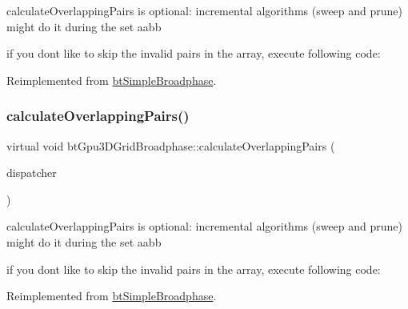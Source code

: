 calculate\+Overlapping\+Pairs is optional\+: incremental algorithms (sweep and prune) might do it during the set aabb 

if you don\textquotesingle{}t like to skip the invalid pairs in the array, execute following code\+: 

Reimplemented from \hyperlink{classbtSimpleBroadphase_ac899d483e888fa132677125c88991de8}{bt\+Simple\+Broadphase}.

\mbox{\label{classbtGpu3DGridBroadphase_ac59344854cc1f33ded7cdedd72c7a454}} 
\subsubsection{\texorpdfstring{calculate\+Overlapping\+Pairs()}{calculateOverlappingPairs()}\hspace{0.1cm}{\footnotesize\ttfamily [2/2]}}
{\footnotesize\ttfamily virtual void bt\+Gpu3\+D\+Grid\+Broadphase\+::calculate\+Overlapping\+Pairs (\begin{DoxyParamCaption}\item[{\hyperlink{classbtDispatcher}{bt\+Dispatcher} $\ast$}]{dispatcher }\end{DoxyParamCaption})\hspace{0.3cm}{\ttfamily [virtual]}}



calculate\+Overlapping\+Pairs is optional\+: incremental algorithms (sweep and prune) might do it during the set aabb 

if you don\textquotesingle{}t like to skip the invalid pairs in the array, execute following code\+: 

Reimplemented from \hyperlink{classbtSimpleBroadphase_ac899d483e888fa132677125c88991de8}{bt\+Simple\+Broadphase}.

\mbox{\label{classbtGpu3DGridBroadphase_ad381f8a0aca01a7147b7a3eafad9ac5a}} 
